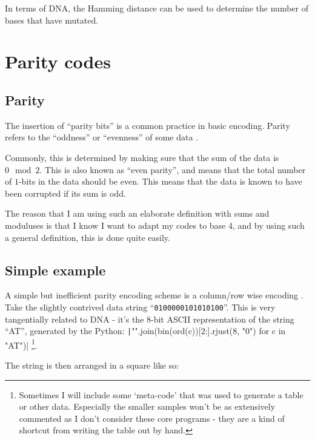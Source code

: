 \documentclass[a4paper,11pt]{article}
\begin{document}
    In terms of DNA, the Hamming distance can be used to determine the
    number of bases that have mutated.


    \section{Parity codes}

    \subsection{Parity}

    The insertion of ``parity bits'' is a common practice in basic encoding.
    Parity refers to the ``oddness'' or ``evenness'' of some data
    \cite{Parity2008Knuth}.

    Commonly, this is determined by making sure that the sum of the data is $0
    \mod 2$. This is also known as ``even parity'', and means that the total
    number of $1$-bits in the data should be even.  This means that the data is
    known to have been corrupted if its sum is odd.

    The reason that I am using such an elaborate definition with sums and
    moduluses is that I know I want to adapt my codes to base 4, and by using
    such a general definition, this is done quite easily.


    \subsection{Simple example}

    A simple but inefficient parity encoding scheme is a column/row wise
    encoding \cite{CodeIntro2010Guruswami}. Take the slightly contrived data
    string ``\texttt{0100000101010100}''.  This is very tangentially related to
    DNA - it's the 8-bit ASCII \cite{ASCII1963ASA} representation of the string
    ``AT'', generated by the Python:
    \texttt|"".join(bin(ord(c))[2:].rjust(8, "0") for c in "AT")|
    \footnote{Sometimes I will include some `meta-code' that was used to
    generate a table or other data. Especially the smaller samples won't be as
    extensively commented as I don't consider these core programs - they are a
    kind of shortcut from writing the table out by hand.}.

    The string is then arranged in a square like so:
\end{document}
